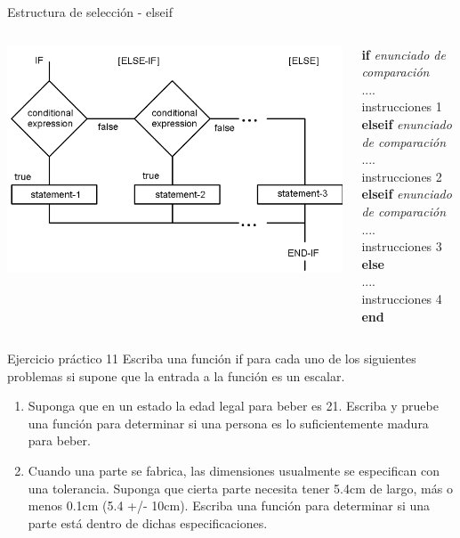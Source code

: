 \documentclass{bredelebeamer}
\begin{document}
\begin{frame}{Estructura de selección - elseif}
\begin{columns}
\begin{column}{0.5\textwidth}
\begin{center}
\includegraphics[scale=0.2]{images/pantalla6.png}
\end{center}
\end{column}
\begin{column}{0.3\textwidth}
\textbf{if} \textit{enunciado de comparación}\\
	....\\
    instrucciones 1\\
\textbf{elseif} \textit{enunciado de comparación}\\
 	....\\
    instrucciones 2\\
\textbf{elseif} \textit{enunciado de comparación}\\
 	....\\
    instrucciones 3\\
\textbf{else}\\
 	....\\
    instrucciones 4\\
\textbf{end}
\end{column}
\end{columns}
\end{frame}

\begin{frame}{Ejercicio práctico 11}
Escriba una función if para cada uno de los siguientes problemas si supone que la entrada a la función es un escalar.
\begin{enumerate}
\item Suponga que en un estado la edad legal para beber es 21. Escriba y pruebe una función para determinar si una persona es lo suficientemente madura para beber.
\item Cuando una parte se fabrica, las dimensiones usualmente se especifican con una tolerancia. Suponga que cierta parte necesita tener 5.4cm de largo, más o menos 0.1cm (5.4 +/- 10cm). Escriba una función para determinar si una parte está dentro de dichas especificaciones.
\end{enumerate}
\end{frame}
\end{document}
